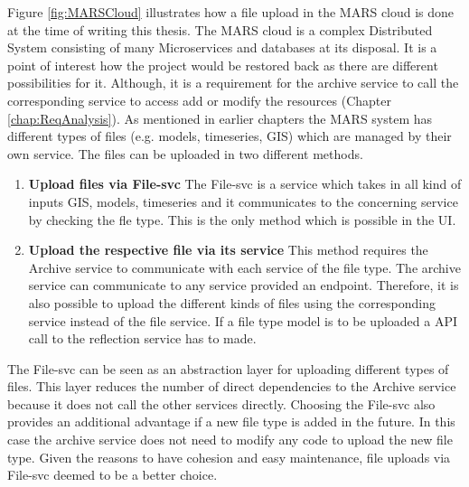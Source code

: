 Figure \ref{fig:MARSCloud} illustrates how a file upload in the MARS cloud is done at the time of writing this thesis. 
The MARS cloud is a complex Distributed System consisting of many 
Microservices and databases at its disposal. It is a point of interest how the project would be restored back as there are different possibilities for it. 
Although, it is a requirement for the archive service
to call the corresponding service to access add or modify the resources (Chapter \ref{chap:ReqAnalysis}). As mentioned in earlier chapters the MARS system
has different types of files (e.g. models, timeseries, GIS) which are managed by their own service. The files can be uploaded in two different methods.
\begin{enumerate}
 \item \textbf{Upload files via File-svc} The File-svc is a service which takes in all kind of inputs GIS, models, timeseries and it communicates to the
 concerning service by checking the fle type. This is the only method which is possible in the UI.  
 \item \textbf{Upload the respective file via its service} This method requires the Archive service to communicate with each service of the file type. 
The archive service can communicate to any service provided an endpoint. Therefore, it is also possible to upload the different kinds of files using the
corresponding service instead of the file service. If a file type model is to be uploaded a API call to the reflection service has to made. 
\end{enumerate} 
The File-svc can be seen as an abstraction layer for uploading different types of files. This layer reduces the number of direct dependencies to the Archive
service because it does not call the other services directly. Choosing the File-svc also provides an additional advantage if a new file type is added in the future.
In this case the archive service does not need to modify any code to upload the new file type. Given the reasons to have cohesion and easy maintenance, file uploads
via File-svc deemed to be a better choice. 

